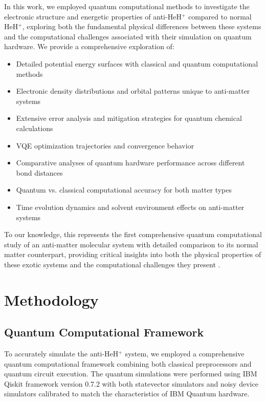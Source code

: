 \documentclass[10pt,twocolumn,a4paper]{article}
\begin{document}
In this work, we employed quantum computational methods to investigate the electronic structure and energetic properties of anti-HeH$^+$ compared to normal HeH$^+$, exploring both the fundamental physical differences between these systems and the computational challenges associated with their simulation on quantum hardware. We provide a comprehensive exploration of:

\begin{itemize}
\item Detailed potential energy surfaces with classical and quantum computational methods
\item Electronic density distributions and orbital patterns unique to anti-matter systems
\item Extensive error analysis and mitigation strategies for quantum chemical calculations
\item VQE optimization trajectories and convergence behavior
\item Comparative analyses of quantum hardware performance across different bond distances
\item Quantum vs. classical computational accuracy for both matter types
\item Time evolution dynamics and solvent environment effects on anti-matter systems
\end{itemize}

To our knowledge, this represents the first comprehensive quantum computational study of an anti-matter molecular system with detailed comparison to its normal matter counterpart, providing critical insights into both the physical properties of these exotic systems and the computational challenges they present \cite{cerezo2021variational}.

\section{Methodology}
\subsection{Quantum Computational Framework}
To accurately simulate the anti-HeH$^+$ system, we employed a comprehensive quantum computational framework combining both classical preprocessors and quantum circuit execution. The quantum simulations were performed using IBM Qiskit framework version 0.7.2 with both statevector simulators and noisy device simulators calibrated to match the characteristics of IBM Quantum hardware.
\end{document}
